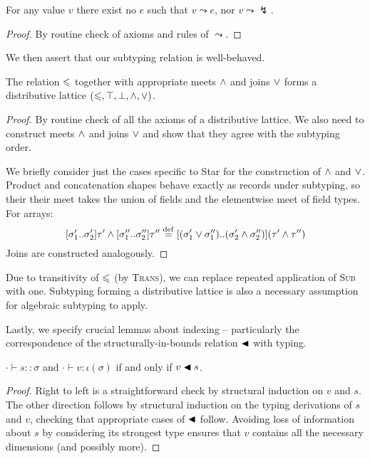 \begin{lemma}
    For any value $v$ there exist no $e$ such that $v \leadsto e$, nor $v \leadsto \lightning$.
\end{lemma}
\begin{proof}
    By routine check of axioms and rules of $\leadsto$.
\end{proof}

We then assert that our subtyping relation is well-behaved.
\begin{lemma}
    The relation $\leqslant$ together with appropriate meets $\land$ and joins $\lor$ forms a distributive lattice $(\leqslant, \top, \bot, \land, \lor)$.
\end{lemma}
\begin{proof}
    By routine check of all the axioms of a distributive lattice. We also need to construct meets $\land$ and joins $\lor$ and show that they agree with the subtyping order. 
    
    We briefly consider just the cases specific to Star for the construction of $\land$ and $\lor$. Product and concatenation shapes behave exactly as records under subtyping, so their their meet takes the union of fields and the elementwise meet of field types. For arrays:
    $$ \sarraytype{\sigma_1'}{\sigma_2'}{\tau'} \meet \sarraytype{\sigma_1''}{\sigma_2''}{\tau''} \stackrel{\mathrm{def}}{=} \sarraytype{(\sigma_1' \join \sigma_1'')}{(\sigma_2' \meet \sigma_2'')}{(\tau' \meet \tau'')} $$
    Joins are constructed analogously.
\end{proof}
Due to transitivity of $\leqslant$ (by \textsc{Trans}), we can replace repeated application of \textsc{Sub} with one. Subtyping forming a distributive lattice is also a necessary assumption for algebraic subtyping to apply.

Lastly, we specify crucial lemmas about indexing -- particularly the correspondence of the structurally-in-bounds relation $\blacktriangleleft$ with typing.

\begin{lemma}
    $\cdot \vdash s :: \sigma$ and $\cdot \vdash v : \iota(\sigma)$ if and only if $v \blacktriangleleft s$.
\end{lemma}
\begin{proof}
    Right to left is a straightforward check by structural induction on $v$ and $s$.
    The other direction follows by structural induction on the typing derivations of $s$ and $v$, checking that appropriate cases of $\blacktriangleleft$ follow. Avoiding loss of information about $s$ by considering its strongest type ensures that $v$ contains all the necessary dimensions (and possibly more). 
\end{proof}

